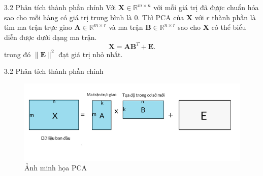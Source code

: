 \documentclass[notheorems,envcountsect,hyperref=unicode]{beamer}
\newcommand{\R}{\mathbb R}
\newcommand{\Q}{\mathbb Q}
\def\A{\mathcal{A}}
\def\R{\mathbb{R}}
\def\Q{\mathbb{Q}}
\def\L{\mathcal{L}}
\def\m{\mu}
\begin{document}
\begin{frame}{3.2 Phân tích thành phần chính}
Với $\mathbf{X} \in \mathbb{R}^{m \times n}$ với mỗi giá trị đã được chuẩn hóa sao cho mỗi hàng có giá trị trung bình là 0. Thì PCA của $\mathbf{X}$ với $r$ thành phần là tìm ma trận trực giao $\mathbf{A} \in \mathbb{R}^{m \times r}$ và ma trận $\mathbf{B} \in \mathbb{R}^{n \times r}$ sao cho $\mathbf{X}$ có thể biểu diễn được dưới dạng ma trận.
$$
\mathbf{X}=\mathbf{A} \mathbf{B}^{T}+\mathbf{E}.
$$
trong đó $\|\mathbf{E}\|^{2}$ đạt giá trị nhỏ nhất.
\end{frame}

\begin{frame}{3.2 Phân tích thành phần chính}
\begin{figure}[htp]
	\includegraphics[scale=0.6]{pca_idea.PNG}
	\caption{ Ảnh minh họa PCA}
\end{figure}	
	
\end{frame}
\end{document}
